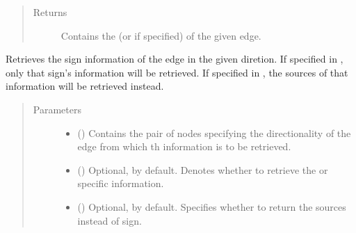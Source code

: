 \documentclass[letterpaper,10pt,english]{sphinxmanual}
\begin{document}
\begin{fulllineitems}
\begin{fulllineitems}
\begin{quote}
\begin{description}
\begin{itemize}
\end{itemize}

\item[{Returns}] \leavevmode
Contains the  (or  if
specified) of the given edge.

\end{description}\end{quote}

\end{fulllineitems}


\begin{fulllineitems}
\label{\detokenize{reference:pypath.main.Direction.get_sign}}
Retrieves the sign information of the edge in the given
diretion. If specified in , only that sign’s information
will be retrieved. If specified in , the sources of
that information will be retrieved instead.
\begin{quote}\begin{description}
\item[{Parameters}] \leavevmode\begin{itemize}
\item {} 
 () \textendash{} Contains the pair of nodes specifying the directionality of
the edge from which th information is to be retrieved.

\item {} 
 () \textendash{} Optional,  by default. Denotes whether to retrieve
the  or  specific information.

\item {} 
 () \textendash{} Optional,  by default. Specifies whether to return
the sources instead of sign.

\end{itemize}


\end{description}
\end{quote}
\end{fulllineitems}
\end{fulllineitems}
\end{document}
